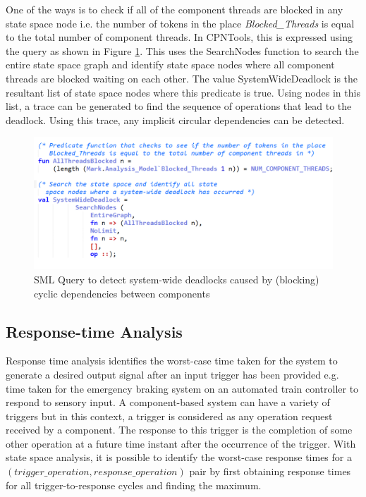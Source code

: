 One of the ways is to check if all of the component threads are blocked in any state space node i.e. the number of tokens in the place \emph{Blocked\_Threads} is equal to the total number of component threads. In CPNTools, this is expressed using the query as shown in Figure \ref{fig:blocked_threads}. This uses the SearchNodes function to search the entire state space graph and identify state space nodes where all component threads are blocked waiting on each other. The value SystemWideDeadlock is the resultant list of state space nodes where this predicate is true. Using nodes in this list, a trace can be generated to find the sequence of operations that lead to the deadlock. Using this trace, any implicit circular dependencies can be detected. 

\begin{figure}[htb]
	\centering
	\includegraphics[width=\textwidth]{./img/blocked_threads.png}
	\caption{SML Query to detect system-wide deadlocks caused by (blocking) cyclic dependencies between components}
	\label{fig:blocked_threads}
\end{figure}
\FloatBarrier

\subsection{Response-time Analysis}

Response time analysis identifies the worst-case time taken for the system to generate a desired output signal after an input trigger has been provided e.g. time taken for the emergency braking system on an automated train controller to respond to sensory input. A component-based system can have a variety of triggers but in this context, a trigger is considered as any operation request received by a component. The response to this trigger is the completion of some other operation at a future time instant after the occurrence of the trigger. With state space analysis, it is possible to identify the worst-case response times for a $(trigger\_operation, response\_operation)$ pair by first obtaining response times for all trigger-to-response cycles and finding the maximum. 

